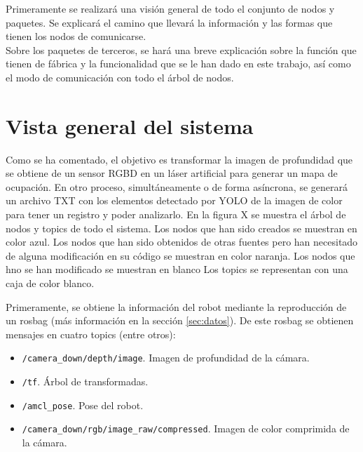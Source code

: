 Primeramente se realizará una visión general de todo el conjunto de nodos y paquetes. Se explicará el camino que llevará la información y las formas que tienen los nodos de comunicarse.\\

Sobre los paquetes de terceros, se hará una breve explicación sobre la función que tienen de fábrica y la funcionalidad que se le han dado en este trabajo, así como el modo de comunicación con todo el árbol de nodos.\\

\section{Vista general del sistema}

Como se ha comentado, el objetivo es transformar la imagen de profundidad que se obtiene de un sensor RGBD en un láser artificial para generar un mapa de ocupación. En otro proceso, simultáneamente o de forma asíncrona, se generará un archivo TXT con los elementos detectado por YOLO de la imagen de color para tener un registro y poder analizarlo. En la figura X se muestra el árbol de nodos y topics de todo el sistema. Los nodos que han sido creados se muestran en color azul. Los nodos que han sido obtenidos de otras fuentes pero han necesitado de alguna modificación en su código se muestran en color naranja. Los nodos que hno se han modificado se muestran en blanco Los topics se representan con una caja de color blanco.\\


Primeramente, se obtiene la información del robot mediante la reproducción de un rosbag (más información en la sección \ref{sec:datos}). De este rosbag se obtienen mensajes en cuatro topics (entre otros): 

\begin{itemize}

	\item \texttt{/camera\_down/depth/image}. Imagen de profundidad de la cámara.
	\item \texttt{/tf}. Árbol de transformadas.
	\item \texttt{/amcl\_pose}. Pose del robot.
	\item \texttt{/camera\_down/rgb/image\_raw/compressed}. Imagen de color comprimida de la cámara.

\end{itemize}

